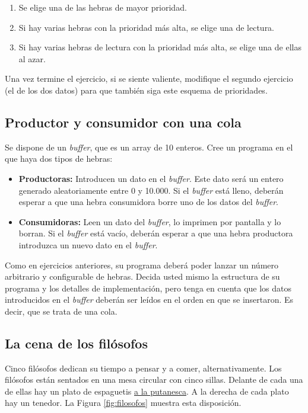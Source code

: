 \documentclass[a4paper]{article}
\begin{document}
\begin{enumerate}
    \item Se elige una de las hebras de mayor prioridad.
    \item Si hay varias hebras con la prioridad más alta, se elige una de lectura.
    \item Si hay varias hebras de lectura con la prioridad más alta, se elige una de ellas al azar.
\end{enumerate}

Una vez termine el ejercicio, si se siente valiente, modifique el segundo ejercicio (el de los dos datos) para que también siga este esquema de prioridades.

\subsection{Productor y consumidor con una cola}

Se dispone de un \textit{buffer}, que es un array de 10 enteros. Cree un programa en el que haya dos tipos de hebras:

\begin{itemize}
    \item \textbf{Productoras:} Introducen un dato en el \textit{buffer}. Este dato será un entero generado aleatoriamente entre 0 y 10.000. Si el \textit{buffer} está lleno, deberán esperar a que una hebra consumidora borre uno de los datos del \textit{buffer}.
    \item \textbf{Consumidoras:} Leen un dato del \textit{buffer}, lo imprimen por pantalla y lo borran. Si el \textit{buffer} está vacío, deberán esperar a que una hebra productora introduzca un nuevo dato en el \textit{buffer}.
\end{itemize}

Como en ejercicios anteriores, su programa deberá poder lanzar un número arbitrario y configurable de hebras. Decida usted mismo la estructura de su programa y los detalles de implementación, pero tenga en cuenta que los datos introducidos en el \textit{buffer} deberán ser leídos en el orden en que se insertaron. Es decir, que se trata de una cola.

\subsection{La cena de los filósofos}

Cinco filósofos dedican su tiempo a pensar y a comer, alternativamente. Los filósofos están sentados en una mesa circular con cinco sillas. Delante de cada una de ellas hay un plato de espaguetis \href{https://canalcocina.es/receta/espaguetis-putanesca}{a la putanesca}. A la derecha de cada plato hay un tenedor. La Figura \ref{fig:filosofos} muestra esta disposición.
\end{document}
